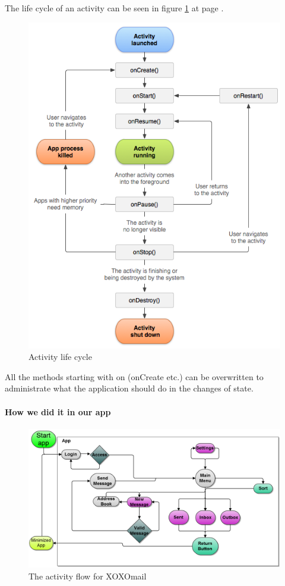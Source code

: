 The life cycle of an activity can be seen in figure \ref{fig:lifecycle} at page \pageref{fig:lifecycle}.
\begin{figure}
	\includegraphics[width=\textwidth]{activity_lifecycle}
	\caption{Activity life cycle \cite{bib:alc}}
	\label{fig:lifecycle}
\end{figure}

All the methods starting with on (onCreate etc.) can be overwritten to administrate what the application should do in the changes of state.

\paragraph{How we did it in our app}

\begin{figure}
	\includegraphics[width=\textwidth]{Android_GUI_flow_chart_2}
	\caption{The activity flow for XOXOmail}
	\label{fig:logicalGUIview}
\end{figure}

